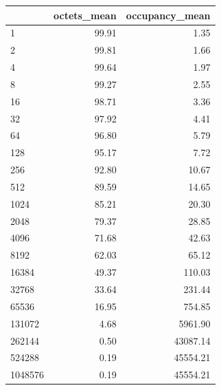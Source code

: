\begin{tabular}{lrr}
\toprule
 & octets_mean & occupancy_mean \\
\midrule
1 & 99.91 & 1.35 \\
2 & 99.81 & 1.66 \\
4 & 99.64 & 1.97 \\
8 & 99.27 & 2.55 \\
16 & 98.71 & 3.36 \\
32 & 97.92 & 4.41 \\
64 & 96.80 & 5.79 \\
128 & 95.17 & 7.72 \\
256 & 92.80 & 10.67 \\
512 & 89.59 & 14.65 \\
1024 & 85.21 & 20.30 \\
2048 & 79.37 & 28.85 \\
4096 & 71.68 & 42.63 \\
8192 & 62.03 & 65.12 \\
16384 & 49.37 & 110.03 \\
32768 & 33.64 & 231.44 \\
65536 & 16.95 & 754.85 \\
131072 & 4.68 & 5961.90 \\
262144 & 0.50 & 43087.14 \\
524288 & 0.19 & 45554.21 \\
1048576 & 0.19 & 45554.21 \\
\bottomrule
\end{tabular}
